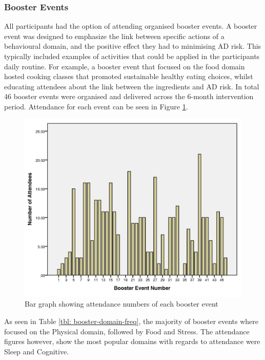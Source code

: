\subsubsection{Booster Events}
All participants had the option of attending organised booster events. A booster event was designed to emphasize the link between specific actions of a behavioural domain, and the positive effect they had to minimising AD risk. This typically included examples of activities that could be applied in the participants daily routine. For example, a booster event that focused on the food domain hosted cooking classes that promoted sustainable healthy eating choices, whilst educating attendees about the link between the ingredients and AD risk. In total 46 booster events were organised and delivered across the 6-month intervention period. Attendance for each event can be seen in Figure \ref{fig: booster-attendance}.

\begin{figure}[h]
    \centering
    \includegraphics[scale=0.5, angle=0]{Files/prevention-study-3/figures/booster-attendance.png}
    \caption{Bar graph showing attendance numbers of each booster event}
    \label{fig: booster-attendance}
\end{figure}

As seen in Table \ref{tbl: booster-domain-freq}, the majority of booster events where focused on the Physical domain, followed by Food and Stress. The attendance figures however, show the most popular domains with regards to attendance were Sleep and Cognitive.

